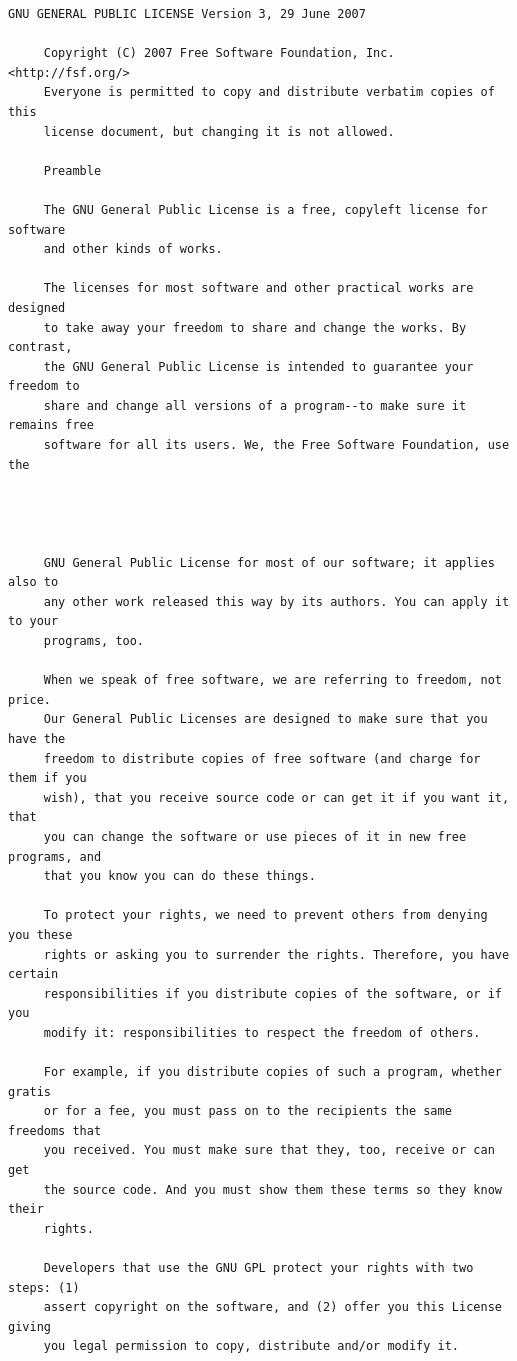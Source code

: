 \begin{lstlisting}[basicstyle=\ttfamily\footnotesize,breaklines=true]
     GNU GENERAL PUBLIC LICENSE Version 3, 29 June 2007

     Copyright (C) 2007 Free Software Foundation, Inc. <http://fsf.org/>
     Everyone is permitted to copy and distribute verbatim copies of this
     license document, but changing it is not allowed.

     Preamble

     The GNU General Public License is a free, copyleft license for software
     and other kinds of works.

     The licenses for most software and other practical works are designed
     to take away your freedom to share and change the works. By contrast,
     the GNU General Public License is intended to guarantee your freedom to
     share and change all versions of a program--to make sure it remains free
     software for all its users. We, the Free Software Foundation, use the




     GNU General Public License for most of our software; it applies also to
     any other work released this way by its authors. You can apply it to your
     programs, too.

     When we speak of free software, we are referring to freedom, not price.
     Our General Public Licenses are designed to make sure that you have the
     freedom to distribute copies of free software (and charge for them if you
     wish), that you receive source code or can get it if you want it, that
     you can change the software or use pieces of it in new free programs, and
     that you know you can do these things.

     To protect your rights, we need to prevent others from denying you these
     rights or asking you to surrender the rights. Therefore, you have certain
     responsibilities if you distribute copies of the software, or if you
     modify it: responsibilities to respect the freedom of others.

     For example, if you distribute copies of such a program, whether gratis
     or for a fee, you must pass on to the recipients the same freedoms that
     you received. You must make sure that they, too, receive or can get
     the source code. And you must show them these terms so they know their
     rights.

     Developers that use the GNU GPL protect your rights with two steps: (1)
     assert copyright on the software, and (2) offer you this License giving
     you legal permission to copy, distribute and/or modify it.


\end{lstlisting}
